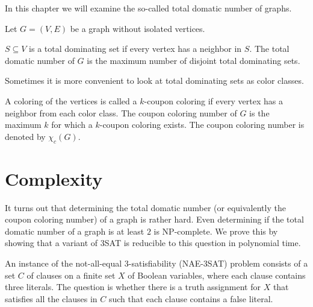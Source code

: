 In this chapter we will examine the so-called total domatic number of graphs.

Let $G = (V, E)$ be a graph without isolated vertices.

\begin{definition}
  $S \subseteq V$ is a total dominating set if every vertex has a neighbor in
  $S$. The total domatic number of $G$ is the maximum number of disjoint total
  dominating sets.
\end{definition}

Sometimes it is more convenient to look at total dominating sets as color classes.

\begin{definition}
  A coloring of the vertices is called a $k$-coupon coloring if every vertex
  has a neighbor from each color class. The coupon coloring number of $G$ is
  the maximum $k$ for which a $k$-coupon coloring exists. The coupon coloring
  number is denoted by $\chi_c(G)$.
\end{definition}

\section{Complexity}

It turns out that determining the total domatic number (or equivalently the
coupon coloring number) of a graph is rather hard. Even determining if the total
domatic number of a graph is at least $2$ is NP-complete. We prove this by showing
that a variant of 3SAT is reducible to this question in polynomial time.

\begin{definition}
  An instance of the not-all-equal 3-satisfiability (NAE-3SAT) problem consists of
  a set $C$ of clauses on a finite set $X$ of Boolean variables, where each clause
  contains three literals. The question is whether there is a truth assignment for
  $X$ that satisfies all the clauses in $C$ such that each clause contains a false
  literal.
\end{definition}

